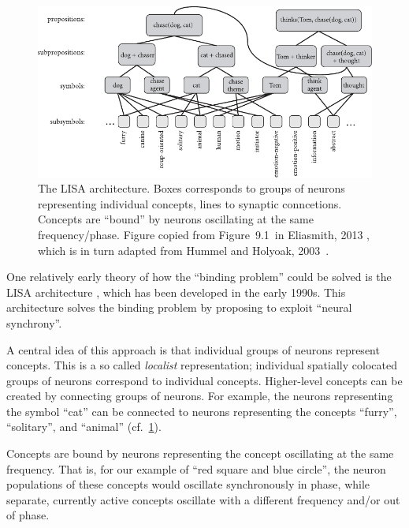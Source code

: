 \documentclass[10pt,letterpaper,oneside]{article}
\begin{document}
\begin{figure}
	\centering
	\includegraphics[width=\textwidth]{media/eliasmith_2013_lisa.pdf}
	\caption{The LISA architecture. Boxes corresponds to groups of neurons representing individual concepts, lines to synaptic conncetions. Concepts are \enquote{bound} by neurons oscillating at the same frequency/phase. Figure copied from Figure~9.1~in Eliasmith, 2013 \cite{eliasmith2013how}, which is in turn adapted from Hummel and Holyoak, 2003~\cite{hummel2003symbolicconnectionist}.}
	\label{fig:eliasmith_2013_lisa.pdf}
\end{figure}

One relatively early theory of how the \enquote{binding problem} could be solved is the LISA architecture \cite{hummel2003symbolicconnectionist}, which has been developed in the early 1990s. This architecture solves the binding problem by proposing to exploit \enquote{neural synchrony}.

A central idea of this approach is that individual groups of neurons represent concepts. This is a so called \emph{localist} representation; individual spatially colocated groups of neurons correspond to individual concepts. Higher-level concepts can be created by connecting groups of neurons. For example, the neurons representing the symbol \enquote{cat} can be connected to neurons representing the concepts \enquote{furry}, \enquote{solitary}, and \enquote{animal} (cf.~\cref{fig:eliasmith_2013_lisa.pdf}).

Concepts are bound by neurons representing the concept oscillating at the same frequency. That is, for our example of \enquote{red square and blue circle}, the neuron populations of these concepts would oscillate synchronously in phase, while separate, currently active concepts oscillate with a different frequency and/or out of phase.

\newpage
\end{document}
